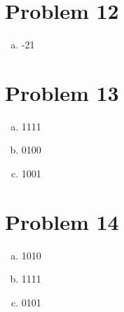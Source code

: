 \documentclass[11pt]{article}
\begin{document}
\section*{Problem 12}
\begin{enumerate}[(a)]
	\item -21
\end{enumerate}

\section*{Problem 13}
\begin{enumerate}[(a)]
	\item 1111
	\item 0100
	\item 1001
\end{enumerate}

\section*{Problem 14}
\begin{enumerate}[(a)]
	\item 1010
	\item 1111
	\item 0101
\end{enumerate}
\end{document}
